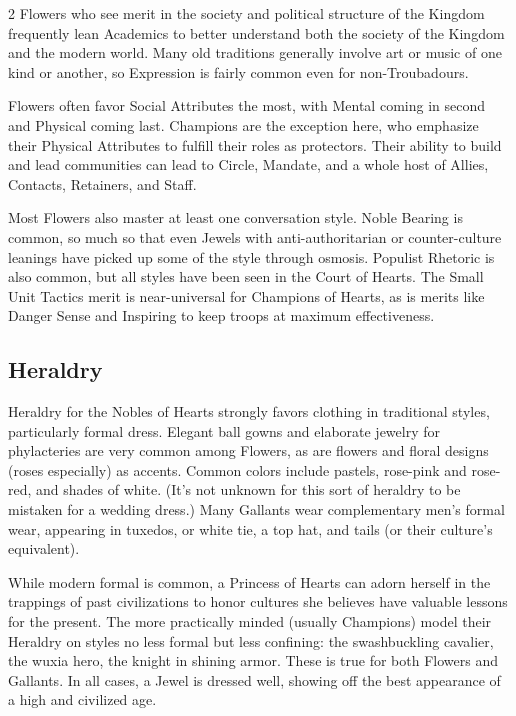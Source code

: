 \begin{multicols}{2}
Flowers who see merit in the society and political structure of the Kingdom frequently lean Academics to better understand both the society of the Kingdom and the modern world. Many old traditions generally involve art or music of one kind or another, so Expression is fairly common even for non-Troubadours. 

Flowers often favor Social Attributes the most, with Mental coming in second and Physical coming last. Champions are the exception here, who emphasize their Physical Attributes to fulfill their roles as protectors. Their ability to build and lead communities can lead to Circle, Mandate, and a whole host of Allies, Contacts, Retainers, and Staff. 

Most Flowers also master at least one conversation style. Noble Bearing is common, so much so that even Jewels with anti-authoritarian or counter-culture leanings have picked up some of the style through osmosis. Populist Rhetoric is also common, but all styles have been seen in the Court of Hearts. The Small Unit Tactics merit is near-universal for Champions of Hearts, as is merits like Danger Sense and Inspiring to keep troops at maximum effectiveness. 

\subsection*{Heraldry}

Heraldry for the Nobles of Hearts strongly favors clothing in traditional styles, particularly formal dress. Elegant ball gowns and elaborate jewelry for phylacteries are very common among Flowers, as are flowers and floral designs (roses especially) as accents. Common colors include pastels, rose-pink and rose-red, and shades of white. (It's not unknown for this sort of heraldry to be mistaken for a wedding dress.) Many Gallants wear complementary men's formal wear, appearing in tuxedos, or white tie, a top hat, and tails (or their culture's equivalent). 

While modern formal is common, a Princess of Hearts can adorn herself in the trappings of past civilizations to honor cultures she believes have valuable lessons for the present. The more practically minded (usually Champions) model their Heraldry on styles no less formal but less confining: the swashbuckling cavalier, the wuxia hero, the knight in shining armor. These is true for both Flowers and Gallants. In all cases, a Jewel is dressed well, showing off the best appearance of a high and civilized age.


\end{multicols}
